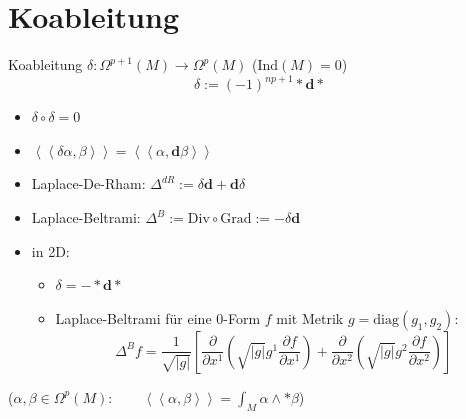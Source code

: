 \documentclass{beamer}
\renewcommand{\d}{\textbf{d}}
\newcommand{\ablx}[2]{\frac{\partial #1}{\partial x^{#2}}}
\begin{document}
  
  
  \section{Koableitung}

  \begin{frame}
    \begin{block}{Koableitung \( \delta: \Omega^{p+1}(M) \longrightarrow \Omega^{p}(M) \) \qquad (Ind\( (M)=0 \))}
      \[ \delta := (-1)^{np+1} * \d * \]
      \begin{itemize}
        \item \( \delta\circ\delta = 0 \)
        \item \( \left\langle\left\langle \delta\alpha , \beta \right\rangle\right\rangle = \left\langle\left\langle \alpha , \d\beta \right\rangle\right\rangle \)
        \item Laplace-De-Rham: \( \Delta^{dR} := \delta\d + \d\delta \)
        \item Laplace-Beltrami: \( \Delta^{B} := \text{Div}\circ\text{Grad} := -\delta\d \)
        \item in 2D:
              \begin{itemize}
                \item \( \delta = - * \d * \)
                \item Laplace-Beltrami für eine \( 0 \)-Form \( f \) mit Metrik \( g=\text{diag}(g_{1}, g_{2}) \):
                      \[ \Delta^{B}f = \frac{1}{\sqrt{|g|}} \left[ \ablx{}{1}\left( \sqrt{|g|}g^{1}\ablx{f}{1}\right) +  \ablx{}{2}\left( \sqrt{|g|}g^{2}\ablx{f}{2}\right)\right] \]
              \end{itemize}
      \end{itemize}
    \end{block}
    (\( \alpha,\beta \in \Omega^{p}(M): \qquad \left\langle\left\langle \alpha , \beta \right\rangle\right\rangle = \int_{M}\alpha\wedge *\beta\))
  \end{frame}
\end{document}
